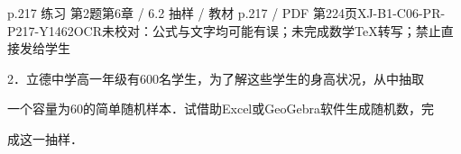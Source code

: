\begin{bankitem}{p.217 练习 第2题}{第6章 / 6.2 抽样 / 教材 p.217 / PDF 第224页}{XJ-B1-C06-PR-P217-Y1462}{OCR未校对：公式与文字均可能有误；未完成数学TeX转写；禁止直接发给学生}
\begin{ocrdraft}
\par
2．立德中学高一年级有600名学生，为了解这些学生的身高状况，从中抽取
\par
一个容量为60的简单随机样本．试借助Excel或GeoGebra软件生成随机数，完
\par
成这一抽样．
\end{ocrdraft}
\end{bankitem}
